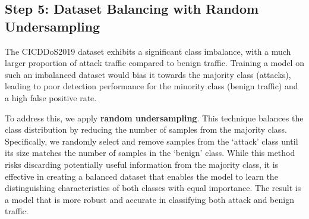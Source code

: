\documentclass{report}
\begin{document}
\subsection{Step 5: Dataset Balancing with Random Undersampling}

The CICDDoS2019 dataset exhibits a significant class imbalance, with a much larger proportion of attack traffic compared to benign traffic. Training a model on such an imbalanced dataset would bias it towards the majority class (attacks), leading to poor detection performance for the minority class (benign traffic) and a high false positive rate.

To address this, we apply \textbf{random undersampling}. This technique balances the class distribution by reducing the number of samples from the majority class. Specifically, we randomly select and remove samples from the `attack' class until its size matches the number of samples in the `benign' class. While this method risks discarding potentially useful information from the majority class, it is effective in creating a balanced dataset that enables the model to learn the distinguishing characteristics of both classes with equal importance. The result is a model that is more robust and accurate in classifying both attack and benign traffic.




\end{document}
